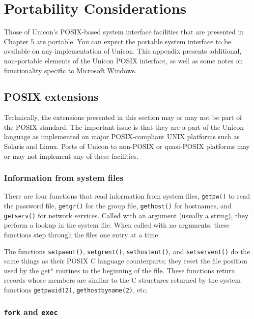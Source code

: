 \chapter{Portability Considerations}

Those of Unicon's POSIX-based system interface facilities that are
presented in Chapter 5 are portable.  You can expect the portable
system interface to be available on any implementation of Unicon. This
appendix presents additional, non-portable elements of the Unicon
POSIX interface, as well as some notes on functionality specific to
Microsoft Windows.

\section{POSIX extensions}

Technically, the extensions presented in this
section may or may not be part of the POSIX standard. The important
issue is that they are a part of the Unicon language as implemented on
major POSIX-compliant UNIX platforms such as Solaris and Linux. Ports
of Unicon to non-POSIX or quasi-POSIX platforms may or may not
implement any of these facilities.

\subsection{Information from system files}

There are four functions that read information from system files,
\texttt{getpw()} to read the password file, \texttt{getgr()} for the
group file, \texttt{gethost()} for hostnames, and \texttt{getserv()}
for network services. Called with an argument (usually a string), they
perform a lookup in the system file. When called with no arguments,
these functions step through the files one entry at a time.

The functions \texttt{setpwent()}, \texttt{setgrent()},
\texttt{sethostent()}, and \texttt{setservent()} do the same things as
their POSIX C language counterparts; they reset the file position used
by the get* routines to the beginning of the file.  These functions
return records whose members are similar to the C structures returned
by the system functions \texttt{getpwuid(2)},
\texttt{gethostbyname(2)}, etc.

\subsection{\texttt{fork} and \texttt{exec}}

